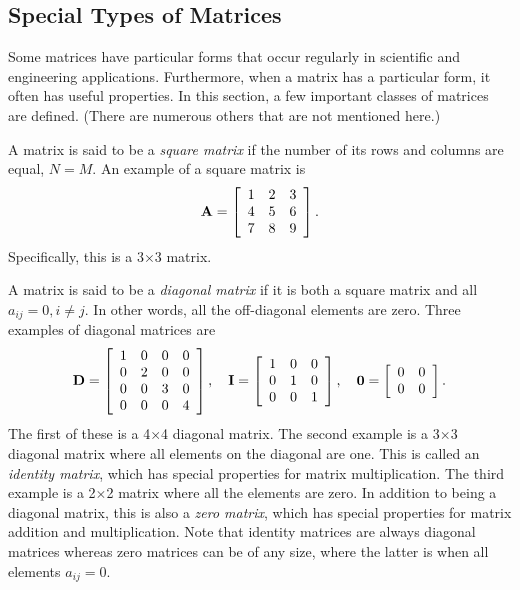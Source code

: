 \subsection{Special Types of Matrices}

Some matrices have particular forms that occur regularly in scientific and engineering applications. Furthermore, when a matrix has a particular form, it often has useful properties. In this section, a few important classes of matrices are defined. (There are numerous others that are not mentioned here.)

A matrix is said to be a \emph{square matrix} if the number of its rows and columns are equal, $N = M$. An example of a square matrix is
\begin{align}
  \mathbf{A} = 
  \left[ \begin{array}{c c c} 1 & 2 & 3 \\ 4 & 5 & 6 \\ 7 & 8 & 9 \end{array} \right]. \nonumber
\end{align}
Specifically, this is a 3$\times$3 matrix.

A matrix is said to be a \emph{diagonal matrix} if it is both a square matrix and all $a_{ij} = 0, i \ne j$. In other words, all the off-diagonal elements are zero. Three examples of diagonal matrices are
\begin{align}
  \mathbf{D} = 
  \left[ \begin{array}{c c c c} 1 & 0 & 0 & 0 \\ 0 & 2 & 0 & 0 \\ 0 & 0 & 3 & 0 \\ 0 & 0 & 0 & 4 \end{array} \right], \quad \nonumber
  \mathbf{I} = 
  \left[ \begin{array}{c c c} 1 & 0 & 0 \\ 0 & 1 & 0 \\ 0 & 0 & 1 \end{array} \right], \quad \nonumber
  \mathbf{0} = 
  \left[ \begin{array}{c c} 0 & 0  \\ 0 & 0 \end{array} \right]. \nonumber
\end{align}
The first of these is a 4$\times$4 diagonal matrix. The second example is a 3$\times$3 diagonal matrix where all elements on the diagonal are one. This is called an \emph{identity matrix}, which has special properties for matrix multiplication. The third example is a 2$\times$2 matrix where all the elements are zero. In addition to being a diagonal matrix, this is also a \emph{zero matrix}, which has special properties for matrix addition and multiplication. Note that identity matrices are always diagonal matrices whereas zero matrices can be of any size, where the latter is when all elements $a_{ij} = 0$.

